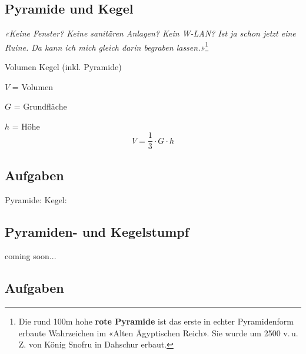 \subsection{Pyramide und Kegel}



\begin{center}
{\textit{«Keine Fenster? Keine sanitären Anlagen? Kein W-LAN? Ist ja schon
jetzt eine Ruine. Da kann ich mich gleich darin begraben
lassen.»}}\footnote{Die rund 100m hohe \textbf{rote Pyramide} ist das
  erste in echter Pyramidenform erbaute Wahrzeichen im «Alten
  Ägyptischen Reich». Sie wurde um 2500 v.\,u.\,Z. von König Snofru in
Dahschur erbaut.}
\end{center}


\begin{gesetz}{Volumen Kegel (inkl. Pyramide)}{}
  
  $V$ = Volumen
  
  $G$ = Grundfläche

  $h$ = Höhe
  $$V = \frac13\cdot{}G\cdot{}h$$
  \end{gesetz}

\subsection*{Aufgaben}
Pyramide:
Kegel:
\newpage

\subsection{Pyramiden- und Kegelstumpf}
coming soon...
\subsection*{Aufgaben}
\newpage
